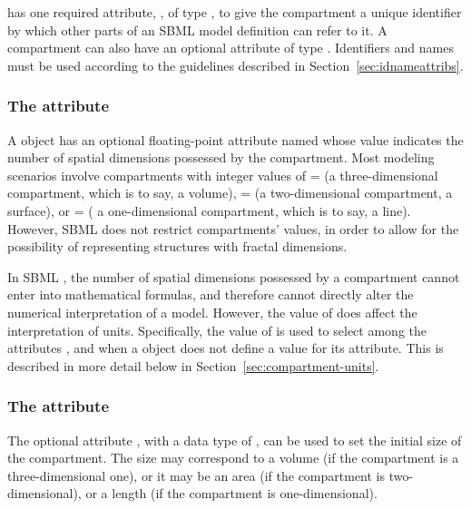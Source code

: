 \Compartment has one required attribute, , of type
, to give the compartment a unique identifier by
which other parts of an SBML model definition can refer to it.  A
compartment can also have an optional  attribute of type
.  Identifiers and names must be used according
to the guidelines described in Section~\ref{sec:idnameattribs}.


\subsubsection{The  attribute}
\label{sec:compartment-spatialdimensions}

A \Compartment object has an optional floating-point attribute
named  whose value indicates the number
of spatial dimensions possessed by the compartment.  Most modeling
scenarios involve compartments with integer values of
= (\ie a three-dimensional
compartment, which is to say, a volume),
= (\ie a two-dimensional
compartment, a surface), or = (\ie
a one-dimensional compartment, which is to say, a line).  However,
SBML \thisL does not restrict compartments'
 values, in order to allow for the
possibility of representing structures with fractal dimensions.

In SBML \thisLV, the number of spatial dimensions possessed by a
compartment cannot enter into mathematical formulas, and therefore
cannot directly alter the numerical interpretation of a model.
However, the value of  does affect the
interpretation of units.  Specifically, the value of
 is used to select among the \Model
attributes ,  and
 when a \Compartment object does not define a
value for its  attribute.  This is described in more
detail below in Section~\ref{sec:compartment-units}.


\subsubsection{The  attribute}
\label{sec:compartment-size}
\label{sec:size}

The optional \Compartment attribute , with a data type
of , can be used to set the initial size of the
compartment.  The size may correspond to a volume (if the
compartment is a three-dimensional one), or it may be an area (if
the compartment is two-dimensional), or a length (if the
compartment is one-dimensional).

